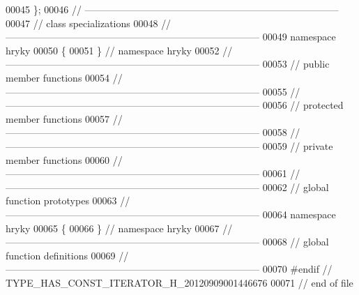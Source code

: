 \begin{DoxyCode}
00045 \};
00046 \textcolor{comment}{//
      ------------------------------------------------------------------------------}
00047 \textcolor{comment}{// class specializations}
00048 \textcolor{comment}{//
      ------------------------------------------------------------------------------}
00049 \textcolor{keyword}{namespace }hryky
00050 \{
00051 \} \textcolor{comment}{// namespace hryky}
00052 \textcolor{comment}{//
      ------------------------------------------------------------------------------}
00053 \textcolor{comment}{// public member functions}
00054 \textcolor{comment}{//
      ------------------------------------------------------------------------------}
00055 \textcolor{comment}{//
      ------------------------------------------------------------------------------}
00056 \textcolor{comment}{// protected member functions}
00057 \textcolor{comment}{//
      ------------------------------------------------------------------------------}
00058 \textcolor{comment}{//
      ------------------------------------------------------------------------------}
00059 \textcolor{comment}{// private member functions}
00060 \textcolor{comment}{//
      ------------------------------------------------------------------------------}
00061 \textcolor{comment}{//
      ------------------------------------------------------------------------------}
00062 \textcolor{comment}{// global function prototypes}
00063 \textcolor{comment}{//
      ------------------------------------------------------------------------------}
00064 \textcolor{keyword}{namespace }hryky
00065 \{
00066 \} \textcolor{comment}{// namespace hryky}
00067 \textcolor{comment}{//
      ------------------------------------------------------------------------------}
00068 \textcolor{comment}{// global function definitions}
00069 \textcolor{comment}{//
      ------------------------------------------------------------------------------}
00070 \textcolor{preprocessor}{#endif // TYPE\_HAS\_CONST\_ITERATOR\_H\_20120909001446676}
00071 \textcolor{preprocessor}{}\textcolor{comment}{// end of file}
\end{DoxyCode}
